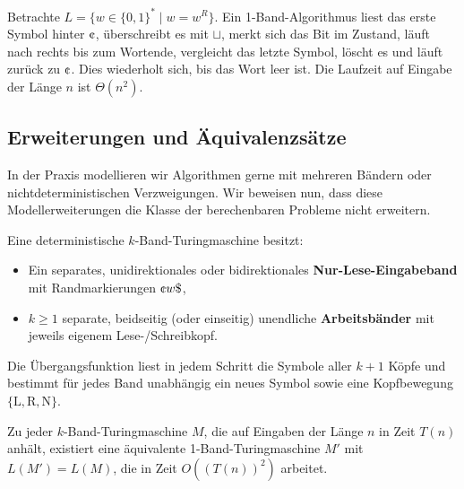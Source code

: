 \begin{beispiel}
    Betrachte $L = \{w \in \{0, 1\}^* \mid w = w^R\}$. Ein 1-Band-Algorithmus liest das erste Symbol hinter $\text{\textcent}$, überschreibt es mit $\sqcup$, merkt sich das Bit im Zustand, läuft nach rechts bis zum Wortende, vergleicht das letzte Symbol, löscht es und läuft zurück zu $\text{\textcent}$. Dies wiederholt sich, bis das Wort leer ist. Die Laufzeit auf Eingabe der Länge $n$ ist $\Theta(n^2)$.
\end{beispiel}

\subsection{Erweiterungen und Äquivalenzsätze}

In der Praxis modellieren wir Algorithmen gerne mit mehreren Bändern oder nichtdeterministischen Verzweigungen. Wir beweisen nun, dass diese Modellerweiterungen die Klasse der berechenbaren Probleme nicht erweitern.

\begin{definition}
    Eine deterministische $k$-Band-Turingmaschine besitzt:
    \begin{itemize}
        \item Ein separates, unidirektionales oder bidirektionales \textbf{Nur-Lese-Eingabeband} mit Randmarkierungen $\text{\textcent} w \$$,
        \item $k \ge 1$ separate, beidseitig (oder einseitig) unendliche \textbf{Arbeitsbänder} mit jeweils eigenem Lese-/Schreibkopf.
    \end{itemize}
    Die Übergangsfunktion liest in jedem Schritt die Symbole aller $k+1$ Köpfe und bestimmt für jedes Band unabhängig ein neues Symbol sowie eine Kopfbewegung $\{\mathrm{L}, \mathrm{R}, \mathrm{N}\}$.
\end{definition}

\begin{theorem}
    Zu jeder $k$-Band-Turingmaschine $M$, die auf Eingaben der Länge $n$ in Zeit $T(n)$ anhält, existiert eine äquivalente 1-Band-Turingmaschine $M'$ mit $L(M') = L(M)$, die in Zeit $O((T(n))^2)$ arbeitet.
\end{theorem}

